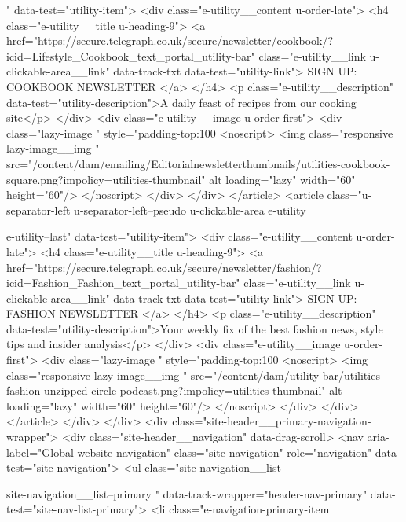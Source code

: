 {{{			" data-test="utility-item">
<div class="e-utility__content u-order-late">
<h4 class="e-utility__title u-heading-9">
<a href="https://secure.telegraph.co.uk/secure/newsletter/cookbook/?icid=Lifestyle_Cookbook_text_portal_utility-bar" class="e-utility__link u-clickable-area__link" data-track-txt data-test="utility-link">
SIGN UP: COOKBOOK NEWSLETTER
</a>
</h4>
<p class="e-utility__description" data-test="utility-description">A daily feast of recipes from our cooking site</p>
</div>
<div class="e-utility__image u-order-first">
<div class="lazy-image   " style="padding-top:100%
<noscript>
<img class="responsive lazy-image__img " src="/content/dam/emailing/Editorialnewsletterthumbnails/utilities-cookbook-square.png?impolicy=utilities-thumbnail" alt loading="lazy" width="60" height="60"/>
</noscript>
</div>
</div>
</article>
<article class="u-separator-left
			u-separator-left--pseudo
			u-clickable-area
			e-utility
			
			 e-utility--last" data-test="utility-item">
<div class="e-utility__content u-order-late">
<h4 class="e-utility__title u-heading-9">
<a href="https://secure.telegraph.co.uk/secure/newsletter/fashion/?icid=Fashion_Fashion_text_portal_utility-bar" class="e-utility__link u-clickable-area__link" data-track-txt data-test="utility-link">
SIGN UP: FASHION NEWSLETTER
</a>
</h4>
<p class="e-utility__description" data-test="utility-description">Your weekly fix of the best fashion news, style tips and insider analysis</p>
</div>
<div class="e-utility__image u-order-first">
<div class="lazy-image   " style="padding-top:100%
<noscript>
<img class="responsive lazy-image__img " src="/content/dam/utility-bar/utilities-fashion-unzipped-circle-podcast.png?impolicy=utilities-thumbnail" alt loading="lazy" width="60" height="60"/>
</noscript>
</div>
</div>
</article>
</div>
</div>
<div class="site-header__primary-navigation-wrapper">
<div class="site-header__navigation" data-drag-scroll>
<nav aria-label="Global website navigation" class="site-navigation" role="navigation" data-test="site-navigation">
<ul class="site-navigation__list
				   
				   site-navigation__list--primary
				   " data-track-wrapper="header-nav-primary" data-test="site-nav-list-primary">
<li class="e-navigation-primary-item
					
}}}

